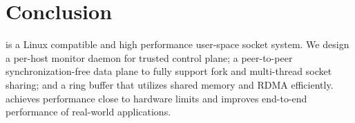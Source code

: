 \section{Conclusion}
\label{sec:conclusion}

\sys{} is a Linux compatible and high performance user-space socket system.
We design a per-host monitor daemon for trusted control plane;
a peer-to-peer synchronization-free data plane to fully support fork and multi-thread socket sharing;
and a ring buffer that utilizes shared memory and RDMA efficiently.
\sys{} achieves performance close to hardware limits and improves end-to-end performance of real-world applications.

